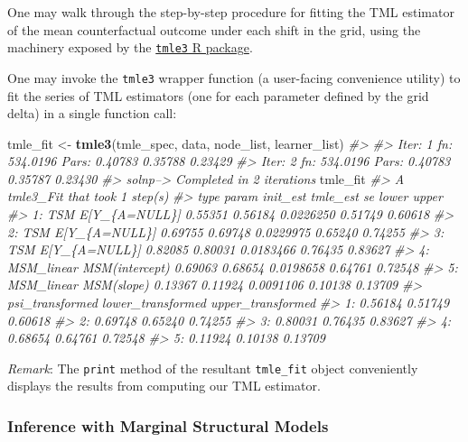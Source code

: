 \documentclass[12pt, krantz2,]{krantz}
\newenvironment{Shaded}{\begin{snugshade}}{\end{snugshade}}
\newcommand{\CommentTok}[1]{\textcolor[rgb]{0.37,0.37,0.37}{\textit{#1}}}
\newcommand{\KeywordTok}[1]{\textcolor[rgb]{0.27,0.27,0.27}{\textbf{#1}}}
\newcommand{\NormalTok}[1]{#1}
\newcommand{\StringTok}[1]{\textcolor[rgb]{0.5,0.5,0.5}{#1}}
\theoremstyle{definition}
\theoremstyle{definition}
\theoremstyle{definition}
\newcommand{\1}{\mathbbm{1}}
\begin{document}
One may walk through the step-by-step procedure for fitting the TML estimator
of the mean counterfactual outcome under each shift in the grid, using the
machinery exposed by the \href{https://tmle3.tlverse.org/}{\texttt{tmle3} R package}.

One may invoke the \texttt{tmle3} wrapper function (a user-facing convenience utility)
to fit the series of TML estimators (one for each parameter defined by the grid
delta) in a single function call:

\begin{Shaded}
\begin{Highlighting}[]
\NormalTok{tmle_fit <-}\StringTok{ }\KeywordTok{tmle3}\NormalTok{(tmle_spec, data, node_list, learner_list)}
\CommentTok{#> }
\CommentTok{#> Iter: 1 fn: 534.0196  Pars:  0.40783 0.35788 0.23429}
\CommentTok{#> Iter: 2 fn: 534.0196  Pars:  0.40783 0.35787 0.23430}
\CommentTok{#> solnp--> Completed in 2 iterations}
\NormalTok{tmle_fit}
\CommentTok{#> A tmle3_Fit that took 1 step(s)}
\CommentTok{#>          type          param init_est tmle_est        se   lower   upper}
\CommentTok{#> 1:        TSM  E[Y_\{A=NULL\}]  0.55351  0.56184 0.0226250 0.51749 0.60618}
\CommentTok{#> 2:        TSM  E[Y_\{A=NULL\}]  0.69755  0.69748 0.0229975 0.65240 0.74255}
\CommentTok{#> 3:        TSM  E[Y_\{A=NULL\}]  0.82085  0.80031 0.0183466 0.76435 0.83627}
\CommentTok{#> 4: MSM_linear MSM(intercept)  0.69063  0.68654 0.0198658 0.64761 0.72548}
\CommentTok{#> 5: MSM_linear     MSM(slope)  0.13367  0.11924 0.0091106 0.10138 0.13709}
\CommentTok{#>    psi_transformed lower_transformed upper_transformed}
\CommentTok{#> 1:         0.56184           0.51749           0.60618}
\CommentTok{#> 2:         0.69748           0.65240           0.74255}
\CommentTok{#> 3:         0.80031           0.76435           0.83627}
\CommentTok{#> 4:         0.68654           0.64761           0.72548}
\CommentTok{#> 5:         0.11924           0.10138           0.13709}
\end{Highlighting}
\end{Shaded}

\emph{Remark}: The \texttt{print} method of the resultant \texttt{tmle\_fit} object conveniently
displays the results from computing our TML estimator.

\hypertarget{inference-with-marginal-structural-models}{%
\subsubsection{Inference with Marginal Structural Models}\label{inference-with-marginal-structural-models}}
\end{document}
